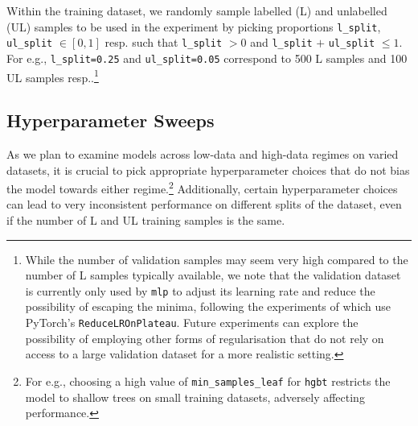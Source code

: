 \documentclass{article}
\begin{document}
Within the training dataset, we randomly sample labelled (L) and unlabelled (UL) samples
to be used in the experiment by picking proportions \texttt{l\_split},
\texttt{ul\_split} $\in [0, 1]$ resp. such that \texttt{l\_split} $> 0$ and
\texttt{l\_split} $+$ \texttt{ul\_split} $\leq 1$.
For e.g., \texttt{l\_split=0.25} and \texttt{ul\_split=0.05} correspond to 500 L samples
and 100 UL samples resp..\footnote{%
  While the number of validation samples may seem very high compared to the number of L
  samples typically available, we note that the validation dataset is currently only
  used by \texttt{mlp} to adjust its learning rate and reduce the possibility of
  escaping the minima, following the experiments of \cite{grinsztajn2022why} which use
  PyTorch's \texttt{ReduceLROnPlateau}.
  Future experiments can explore the possibility of employing other forms of
  regularisation that do not rely on access to a large validation dataset for a more
  realistic setting.
}

\subsection{Hyperparameter Sweeps}

As we plan to examine models across low-data and high-data regimes on varied datasets,
it is crucial to pick appropriate hyperparameter choices that do not bias the model
towards either regime.\footnote{%
  For e.g., choosing a high value of \texttt{min\_samples\_leaf} for \texttt{hgbt}
  restricts the model to shallow trees on small training datasets, adversely affecting
  performance.
} Additionally, certain hyperparameter choices can lead to very inconsistent performance
on different splits of the dataset, even if the number of L and UL training samples is
the same.
\end{document}
